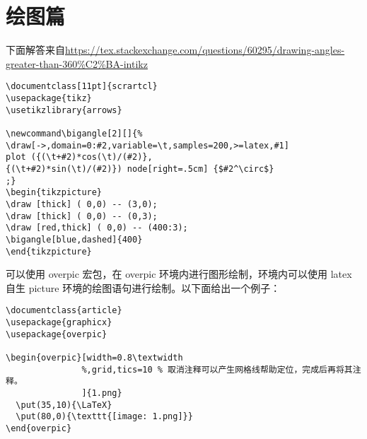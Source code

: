 %
%
%
%


\section{绘图篇}



下面解答来自\url{https://tex.stackexchange.com/questions/60295/drawing-angles-greater-than-360\%C2\%BA-intikz}

\begin{verbatim}
\documentclass[11pt]{scrartcl}
\usepackage{tikz}
\usetikzlibrary{arrows}

\newcommand\bigangle[2][]{%
\draw[->,domain=0:#2,variable=\t,samples=200,>=latex,#1]
plot ({(\t+#2)*cos(\t)/(#2)},
{(\t+#2)*sin(\t)/(#2)}) node[right=.5cm] {$#2^\circ$}
;}
\begin{tikzpicture}
\draw [thick] ( 0,0) -- (3,0);
\draw [thick] ( 0,0) -- (0,3);
\draw [red,thick] ( 0,0) -- (400:3);
\bigangle[blue,dashed]{400}
\end{tikzpicture}

\end{verbatim}






可以使用 overpic 宏包，在 overpic 环境内进行图形绘制，环境内可以使用
latex 自生 picture 环境的绘图语句进行绘制。以下面给出一个例子：

\begin{verbatim}
\documentclass{article}
\usepackage{graphicx}
\usepackage{overpic}

\begin{overpic}[width=0.8\textwidth
               %,grid,tics=10 % 取消注释可以产生网格线帮助定位，完成后再将其注释。
               ]{1.png}
  \put(35,10){\LaTeX}
  \put(80,0){\texttt{[image: 1.png]}}
\end{overpic}

\end{verbatim}

